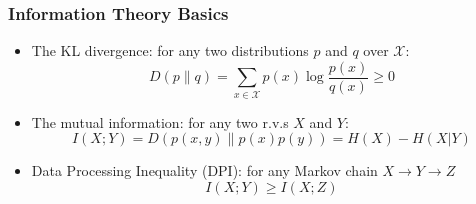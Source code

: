 \documentclass[notes]{beamer}
\begin{document}



\begin{frame}
    \frametitle{Information Theory Basics}
    
    \begin{itemize}
        \item The KL divergence: for any two distributions $p$ and $q$ over $\mathcal{X}$:
        \begin{equation*}
            D\left(p \| q\right) = \sum_{x\in\mathcal{X}} p(x) \log \frac{p(x)}{q(x)} \ge 0
        \end{equation*}
        \item The mutual information: for any two r.v.s $X$ and $Y$:
        \begin{equation*}
            I(X;Y)=D\left(p(x,y) \| p(x)p(y)\right) = H(X) - H(X|Y)
        \end{equation*}
        \item Data Processing Inequality (DPI): for any Markov chain $X\to Y\to Z$
        \begin{equation*}
            I(X;Y)\geq I(X;Z)
        \end{equation*}
    \end{itemize}
    
\end{frame}

\end{document}
